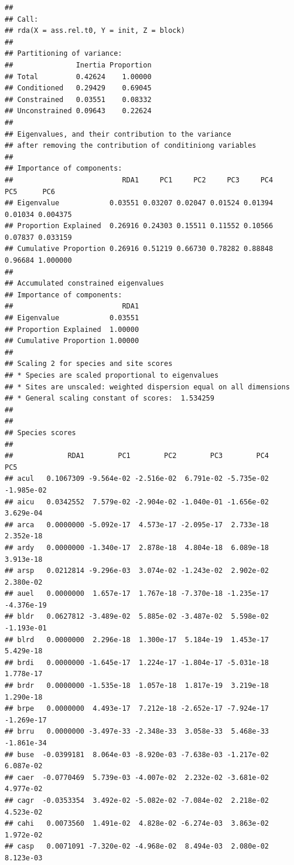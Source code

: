 \documentclass[
]{article}
\begin{document}
\begin{verbatim}
## 
## Call:
## rda(X = ass.rel.t0, Y = init, Z = block) 
## 
## Partitioning of variance:
##               Inertia Proportion
## Total         0.42624    1.00000
## Conditioned   0.29429    0.69045
## Constrained   0.03551    0.08332
## Unconstrained 0.09643    0.22624
## 
## Eigenvalues, and their contribution to the variance 
## after removing the contribution of conditiniong variables
## 
## Importance of components:
##                          RDA1     PC1     PC2     PC3     PC4     PC5      PC6
## Eigenvalue            0.03551 0.03207 0.02047 0.01524 0.01394 0.01034 0.004375
## Proportion Explained  0.26916 0.24303 0.15511 0.11552 0.10566 0.07837 0.033159
## Cumulative Proportion 0.26916 0.51219 0.66730 0.78282 0.88848 0.96684 1.000000
## 
## Accumulated constrained eigenvalues
## Importance of components:
##                          RDA1
## Eigenvalue            0.03551
## Proportion Explained  1.00000
## Cumulative Proportion 1.00000
## 
## Scaling 2 for species and site scores
## * Species are scaled proportional to eigenvalues
## * Sites are unscaled: weighted dispersion equal on all dimensions
## * General scaling constant of scores:  1.534259 
## 
## 
## Species scores
## 
##             RDA1        PC1        PC2        PC3        PC4        PC5
## acul   0.1067309 -9.564e-02 -2.516e-02  6.791e-02 -5.735e-02 -1.985e-02
## aicu   0.0342552  7.579e-02 -2.904e-02 -1.040e-01 -1.656e-02  3.629e-04
## arca   0.0000000 -5.092e-17  4.573e-17 -2.095e-17  2.733e-18  2.352e-18
## ardy   0.0000000 -1.340e-17  2.878e-18  4.804e-18  6.089e-18  3.913e-18
## arsp   0.0212814 -9.296e-03  3.074e-02 -1.243e-02  2.902e-02  2.380e-02
## auel   0.0000000  1.657e-17  1.767e-18 -7.370e-18 -1.235e-17 -4.376e-19
## bldr   0.0627812 -3.489e-02  5.885e-02 -3.487e-02  5.598e-02 -1.193e-01
## blrd   0.0000000  2.296e-18  1.300e-17  5.184e-19  1.453e-17  5.429e-18
## brdi   0.0000000 -1.645e-17  1.224e-17 -1.804e-17 -5.031e-18  1.778e-17
## brdr   0.0000000 -1.535e-18  1.057e-18  1.817e-19  3.219e-18  1.290e-18
## brpe   0.0000000  4.493e-17  7.212e-18 -2.652e-17 -7.924e-17 -1.269e-17
## brru   0.0000000 -3.497e-33 -2.348e-33  3.058e-33  5.468e-33 -1.861e-34
## buse  -0.0399181  8.064e-03 -8.920e-03 -7.638e-03 -1.217e-02  6.087e-02
## caer  -0.0770469  5.739e-03 -4.007e-02  2.232e-02 -3.681e-02  4.977e-02
## cagr  -0.0353354  3.492e-02 -5.082e-02 -7.084e-02  2.218e-02  4.523e-02
## cahi   0.0073560  1.491e-02  4.828e-02 -6.274e-03  3.863e-02  1.972e-02
## casp   0.0071091 -7.320e-02 -4.968e-02  8.494e-03  2.080e-02  8.123e-03

\end{verbatim}
\end{document}
